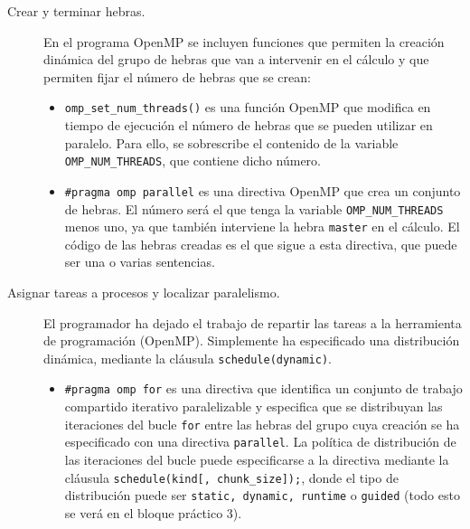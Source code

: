 \begin{description}
    \item [Crear y terminar hebras.] En el programa OpenMP se incluyen funciones que permiten la creación dinámica del grupo de hebras que van a intervenir en el cálculo y que permiten fijar el número de hebras que se crean:
        \begin{itemize}
            \item \verb|omp_set_num_threads()| es una función OpenMP que modifica en tiempo de ejecución el número de hebras que se pueden utilizar en paralelo. Para ello, se sobrescribe el contenido de la variable \verb|OMP_NUM_THREADS|, que contiene dicho número.
            \item \verb|#pragma omp parallel| es una directiva OpenMP que crea un conjunto de hebras. El número será el que tenga la variable \verb|OMP_NUM_THREADS| menos uno, ya que también interviene la hebra \verb|master| en el cálculo. El código de las hebras creadas es el que sigue a esta directiva, que puede ser una o varias sentencias.
        \end{itemize}
    \item [Asignar tareas a procesos y localizar paralelismo.] El programador ha dejado el trabajo de repartir las tareas a la herramienta de programación (OpenMP). Simplemente ha especificado una distribución dinámica, mediante la cláusula \verb|schedule(dynamic)|.
        \begin{itemize}
            \item \verb|#pragma omp for| es una directiva que identifica un conjunto de trabajo compartido iterativo paralelizable y especifica que se distribuyan las iteraciones del bucle \verb|for| entre las hebras del grupo cuya creación se ha especificado con una directiva \verb|parallel|. La política de distribución de las iteraciones del bucle puede especificarse a la directiva mediante la cláusula \verb|schedule(kind[, chunk_size]);|, donde el tipo de distribución puede ser \verb|static, dynamic, runtime| o \verb|guided| (todo esto se verá en el bloque práctico 3).


\end{itemize}
\end{description}
